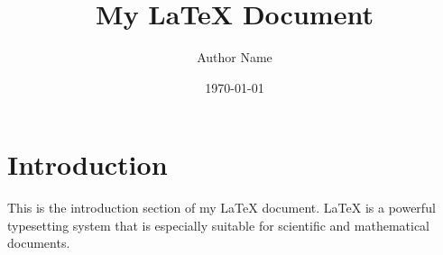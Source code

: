 \documentclass{article}
\title{My LaTeX Document}
\author{Author Name}
\date{\today}
\begin{document}
\maketitle

\section{Introduction}
This is the introduction section of my LaTeX document. LaTeX is a powerful typesetting system that is especially suitable for scientific and mathematical documents.
\end{document}
